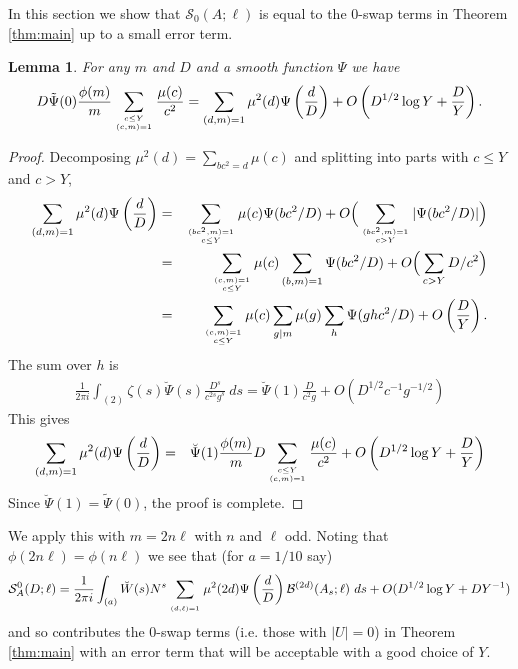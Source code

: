 \documentclass[12pt]{amsart}
\newtheorem{lemma}{Lemma}
\begin{document}
	In this section we show that $\mathcal S_0(A;\ell)$ is equal to the 0-swap terms in Theorem \ref{thm:main} up to a small error term. 
	
	\begin{lemma} \label{lemma:small mobius sum} For any $m$ and $D$ and a smooth function $\Psi$ we have
		$$D \tilde{\Psi}(0) \frac{\phi(m)}{m}  \sum_{{c\le Y\atop (c,m)=1} }\frac{\mu(c)}{c^2} = \sum_{(d,m)=1}\mu^2(d) \Psi\left(\frac d D\right)+O\left(D^{1/2}\log Y + \frac{D}{Y}\right).$$
	\end{lemma}
	
	\begin{proof}
		Decomposing $\mu^2(d) = \sum_{bc^2 = d} \mu(c)$ and splitting into parts with $c \leq Y$ and $c > Y$,
		\begin{eqnarray*}
			\sum_{(d,m)=1}\mu^2(d)\Psi\left(\frac d D\right)&=& \sum_{(b c^2,m)=1 \atop c \le Y} \mu(c)\Psi(b c^2/D) + O\Big(\sum_{(b c^2,m)=1 \atop c > Y} |\Psi(b c^2/D)| \Big) \\
			&=&  \sum_{(c,m)=1\atop c\le Y } \mu(c) \sum_{(b,m)=1} \Psi(b c^2/D) +O\Big( \sum_{c > Y} D/c^2 \Big)\\
			&=&  \sum_{(c,m)=1\atop c\le Y } \mu(c) \sum_{g\mid m}\mu(g) \sum_{h} \Psi(gh c^2/D) +O\left(\frac DY\right).
		\end{eqnarray*}
		The sum over $h$ is 
		\begin{eqnarray*}
			\frac{1}{2\pi i} \int_{(2)}\zeta(s)  \breve{\Psi}(s) \frac{D^s}{c^{2s}g^s} ~ds =\breve{\Psi}(1)\frac{D}{c^2g} +O\left( D^{1/2}c^{-1}g^{-1/2} \right)
		\end{eqnarray*}
		This gives 
		\begin{eqnarray*}
			\sum_{(d,m)=1}\mu^2(d)\Psi\left(\frac d D\right)
			&=&  \breve{\Psi}(1)\frac{\phi(m)}{m} D \sum_{{c\le Y\atop (c,m)=1} }\frac{\mu(c)}{c^2} +O\left(D^{1/2}\log Y + \frac DY\right)\\
		\end{eqnarray*}
		Since
		$\breve \Psi(1) =  \tilde\Psi(0)$, the proof is complete.
	\end{proof}
	
	We apply this with $m=2n\ell$ with $n $ and $\ell$ odd. Noting that $\phi(2n\ell) =\phi(n\ell)$ we see that (for $a = 1/10$ say)
	\begin{equation}
		\label{eq:1swap}
		\mathcal S_A^0(D;\ell)=
		\frac{1}{2\pi i}\int_{(a)} \breve W(s) N^s
		\sum_{\atop (d,\ell)=1} \mu^2(2d) \Psi\left(\frac dD\right) \mathcal B^{(2d)}(A_s;\ell)~ds +O( D^{1/2}\log Y +DY^{-1})
	\end{equation}
	and so contributes the 0-swap terms (i.e. those with $|U|=0$) in Theorem \ref{thm:main} with an error term that will be acceptable with a good choice of $Y$.
	
\end{document}
